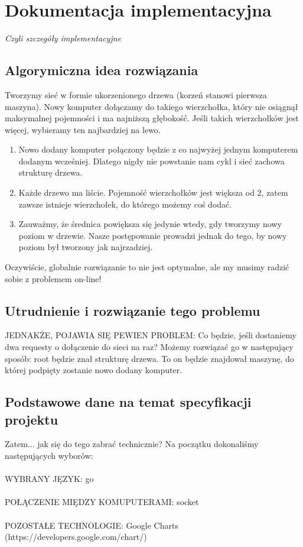 \section{Dokumentacja implementacyjna}

\begin{center}
\textit{Czyli szczegóły implementacyjne}
\end{center}


\subsection{Algorymiczna idea rozwiązania}
Tworzymy sieć w formie ukorzenionego drzewa (korzeń stanowi pierwsza maszyna). Nowy komputer dołączamy do takiego wierzchołka, który nie osiągnął maksymalnej pojemności i ma najniższą głębokość. Jeśli takich wierzchołków jest więcej, wybieramy ten najbardziej na lewo.

\begin{enumerate}
\item %
Nowo dodany komputer połączony będzie z co najwyżej jednym komputerem dodanym wcześniej. Dlatego nigdy nie powstanie nam cykl i sieć zachowa strukturę drzewa.
\item %
Każde drzewo ma liście. Pojemność wierzchołków jest większa od 2, zatem zawsze istnieje wierzchołek, do którego możemy coś dodać.
\item %
Zauważmy, że średnica powiększa się jedynie wtedy, gdy tworzymy nowy poziom w drzewie. Nasze postępowanie prowadzi jednak do tego, by nowy poziom był tworzony jak najrzadziej.
\end{enumerate}
Oczywiście, globalnie rozwiązanie to nie jest optymalne, ale my musimy radzić sobie z problemem on-line!


\subsection{Utrudnienie i rozwiązanie tego problemu}
JEDNAKŻE, POJAWIA SIĘ PEWIEN PROBLEM: Co będzie, jeśli dostaniemy dwa requesty o dołączenie do sieci na raz?
Możemy rozwiązać go w następujący sposób: root będzie znał strukturę drzewa. To on będzie znajdował maszynę, do której podpięty zostanie nowo dodany komputer.


\subsection{Podstawowe dane na temat specyfikacji projektu}
Zatem... jak się do tego zabrać technicznie? Na początku dokonaliśmy następujących wyborów:\\
\\
WYBRANY JĘZYK: go\\
\\
POŁĄCZENIE MIĘDZY KOMUPUTERAMI: socket\\
\\
POZOSTAŁE TECHNOLOGIE: Google Charts (https://developers.google.com/chart/)\\
\\

